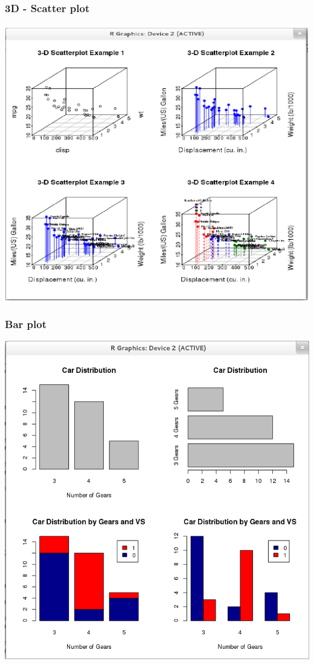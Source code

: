 \documentclass[12pt]{beamer}
\begin{document}
\begin{frame}[fragile]
\frametitle{3D - Scatter plot}
\includegraphics[scale=0.5]{3Dscatterplot}
\end{frame}

\begin{frame}[fragile]
\frametitle{Bar plot}
\includegraphics[scale=0.3]{barplot}
\end{frame}
\end{document}

